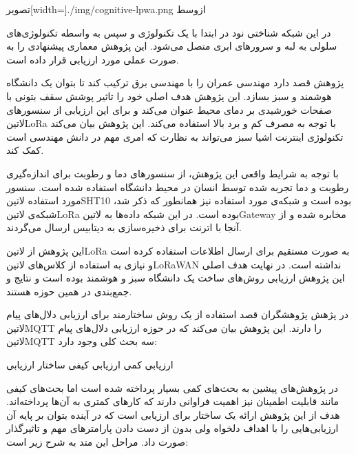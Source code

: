 ‌تصویر[width=\textwidth]{./img/cognitive-lpwa.png}
‌ازوسط

در این شبکه شناختی نود در ابتدا با یک تکنولوژی و سپس به واسطه تکنولوژی‌های سلولی به لبه و سرورهای ابری متصل می‌شود. این پژوهش معماری پیشنهادی را به صورت عملی مورد ارزیابی قرار داده است.


پژوهش  قصد دارد مهندسی عمران را با مهندسی برق ترکیب کند تا بتوان یک دانشگاه هوشمند و سبز بسازد. این پژوهش هدف اصلی خود را تاثیر پوشش سقف بتونی با صفحات خورشیدی
بر دمای محیط عنوان می‌کند و برای این ارزیابی از سنسورهای ‌لاتین{LoRa} با توجه به مصرف کم و برد بالا استفاده می‌کند. این پژوهش بیان می‌کند تکنولوژی اینترنت اشیا سبز می‌تواند به نظارت که امری مهم
در دانش مهندسی است کمک کند.

با توجه به شرایط واقعی این پژوهش، از سنسورهای دما و رطوبت برای اندازه‌گیری رطوبت و دما تجربه شده توسط انسان در محیط دانشگاه استفاده شده است.
سنسور مورد استفاده ‌لاتین{SHT10} بوده است و شبکه‌ی مورد استفاده نیز همانطور که ذکر شد، شبکه‌ی ‌لاتین{LoRa} بوده است. در این شبکه داده‌ها
به ‌لاتین{Gateway} مخابره شده و از آنجا با اترنت برای ذخیره‌سازی به دیتابیس ارسال می‌گردند.

این پژوهش از ‌لاتین{LoRa} به صورت مستقیم برای ارسال اطلاعات استفاده کرده است و نیازی به استفاده از کلاس‌های ‌لاتین{LoRaWAN} نداشته است.
در نهایت هدف اصلی این پژوهش ارزیابی روش‌های ساخت یک دانشگاه سبز و هوشمند بوده است و نتایج و جمع‌بندی در همین حوزه هستند.


در پژهش  پژوهشگران قصد استفاده از یک روش ساختارمند برای ارزیابی دلال‌های پیام ‌لاتین{MQTT} را دارند.
این پژوهش بیان می‌کند که در حوزه ارزیابی دلال‌های پیام ‌لاتین{MQTT} سه بحث کلی وجود دارد:

 ارزیابی کمی
 ارزیابی کیفی
 ساختار ارزیابی

در پژوهش‌های پیشین به بحث‌های کمی بسیار پرداخته شده است اما بحث‌های کیفی مانند قابلیت اطمینان نیز اهمیت فراوانی دارند
که کارهای کمتری به آن‌ها پرداخته‌اند. هدف از این پژوهش ارائه یک ساختار برای ارزیابی است که در آینده بتوان بر پایه آن ارزیابی‌هایی
را با اهداف دلخواه ولی بدون از دست دادن پارامترهای مهم و تاثیرگذار صورت داد. مراحل این متد به شرح زیر است:

